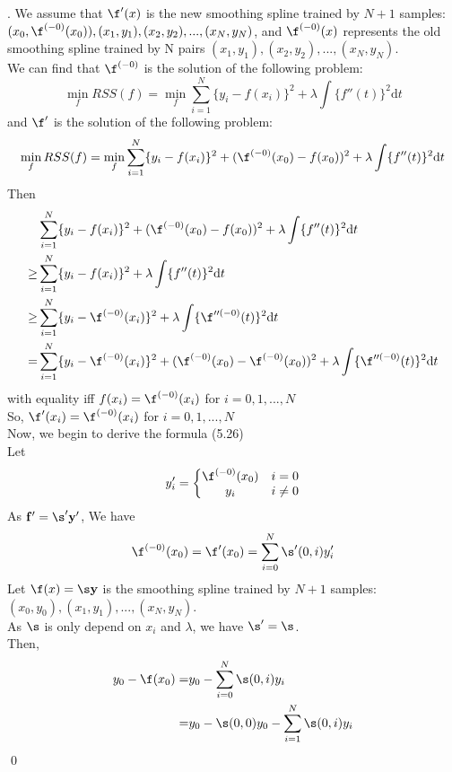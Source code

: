 \documentclass[12pt]{article}
\newenvironment{sol}
  {\par\vspace{3mm}\noindent{\it Solution}.}
  {\qed}
\begin{document}
\begin{sol}
We assume that $\f'(x)$ is the new smoothing spline trained by $N+1$ samples: $(x_0,\f^{(-0)}(x_0)),(x_1,y_1),(x_2,y_2),...,(x_N,y_N)$, and $\f^{(-0)}(x)$ represents the old smoothing spline trained by N pairs $(x_1,y_1),(x_2,y_2),...,(x_N,y_N)$.\\
We can find that $\f^{(-0)}$ is the solution of the following problem:
$$\min_fRSS(f)=\min_f\sum_{i=1}^N\{y_i-f(x_i)\}^2+\lambda\int\{f''(t)\}^2\mathrm{d}t$$
and $\f'$ is the solution of the following problem:
$$\min_fRSS(f)=\min_f\sum_{i=1}^N\{y_i-f(x_i)\}^2+(\f^{(-0)}(x_0)-f(x_0))^2+\lambda\int\{f''(t)\}^2\mathrm{d}t$$
Then
\begin{equation*}
\begin{split}
&\sum_{i=1}^N\{y_i-f(x_i)\}^2+(\f^{(-0)}(x_0)-f(x_0))^2+\lambda\int\{f''(t)\}^2\mathrm{d}t\\
\geq &\sum_{i=1}^N\{y_i-f(x_i)\}^2+\lambda\int\{f''(t)\}^2\mathrm{d}t\\
\geq &\sum_{i=1}^N\{y_i-\f^{(-0)}(x_i)\}^2+\lambda\int\{{\f''^{(-0)}}(t)\}^2\mathrm{d}t\\
= &\sum_{i=1}^N\{y_i-\f^{(-0)}(x_i)\}^2+(\f^{(-0)}(x_0)-\f^{(-0)}(x_0))^2+\lambda\int\{\f''^{(-0)}(t)\}^2\mathrm{d}t\\
\end{split}
\end{equation*}
with equality iff $f(x_i)=\f^{(-0)}(x_i)$ for $i=0,1,...,N$\\
So, $\f'(x_i)=\f^{(-0)}(x_i)$ for $i=0,1,...,N$\\
Now, we begin to derive the formula (5.26)\\
Let
$$y'_i=\left\{
\begin{matrix}
\f^{(-0)}(x_0) & i=0\\
y_i & i\neq0\\
\end{matrix}
\right.$$
As $\mathbf{f}'=\s'\mathbf{y}'$, We have
$$\f^{(-0)}(x_0)=\f'(x_0)=\sum_{i=0}^{N}\s'(0,i)y_i'$$
Let $\f(x)=\s\mathbf{y}$ is the smoothing spline trained by $N+1$ samples:\\
$(x_0,y_0),(x_1,y_1),...,(x_N,y_N)$.\\
As $\s$ is only depend on $x_i$ and $\lambda$, we have $\s'=\s$.\\
Then,
\begin{equation*}
\begin{split}
y_0-\f(x_0)=&y_0-\sum_{i=0}^{N}\s(0,i)y_i\\
=&y_0-\s(0,0)y_0-\sum_{i=1}^N\s(0,i)y_i\\

\end{split}
\end{equation*}
\end{sol}
\end{document}
